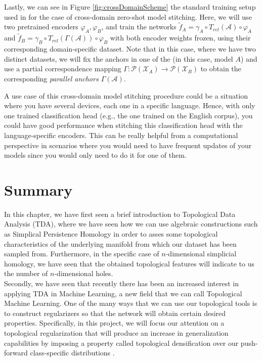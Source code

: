 \documentclass[../main.tex]{subfiles}
\begin{document}
Lastly, we can see in Figure \ref{fig:crossDomainScheme} the standard training setup used in \cite{moschella_relative_2022} for the case of cross-domain zero-shot model stitching. Here, we will use two pretrained encoders $\varphi_A, \varphi_B$, and train the networks $\tilde{f}_{A}=\gamma_A \circ T_{rel}(\mathcal{A})  \circ \varphi_A$ and $\tilde{f}_{B}=\gamma_B \circ T_{rel}(\Gamma(\mathcal{A}))  \circ \varphi_B$ with both encoder weights frozen, using their corresponding domain-specific dataset. Note that in this case, where we have two distinct datasets, we will fix the anchors in one of the (in this case, model $A$) and use a partial correspondence mapping $\Gamma: \mathcal{P}(\mathcal{X}_A) \to \mathcal{P}(\mathcal{X}_B)$ to obtain the corresponding \emph{parallel anchors $\Gamma(\mathcal{A})$}.

A use case of this cross-domain model stitching procedure could be a situation where you have several devices, each one in a specific language. Hence, with only one trained classification head (e.g., the one trained on the English corpus), you could have good performance when stitching this classification head with the language-specific encoders. This can be really helpful from a computational perspective in scenarios where you would need to have frequent updates of your models since you would only need to do it for one of them.



\section{Summary}
In this chapter, we have first seen a brief introduction to Topological Data Analysis (TDA), where we have seen how we can use algebraic constructions such as Simplical Persistence Homology in order to asses some topological characteristics of the underlying manifold from which our dataset has been sampled from. Furthermore, in the specific case of $n$-dimensional simplicial homology, we have seen that the obtained topological features will indicate to us the number of $n$-dimensional holes.\\

Secondly, we have seen that recently there has been an increased interest in applying TDA in Machine Learning, a new field that we can call Topological Machine Learning. One of the many ways that we can use our topological tools is to construct regularizers so that the network will obtain certain desired properties. Specifically, in this project, we will focus our attention on a topological regularization that will produce an increase in generalization capabilities by imposing a property called topological densification over our push-forward class-specific distributions \cite{hofer_densified_2021}.\\
\end{document}
